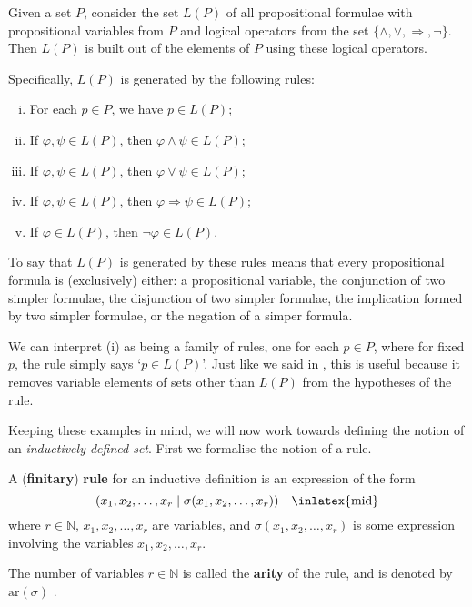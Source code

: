\begin{example}
\label{exPropositionalFormulaeAsInductivelyDefinedSetPreliminary}
Given a set $P$, consider the set $L(P)$ of all propositional formulae with propositional variables from $P$ and logical operators from the set $\{ {\wedge}, {\vee}, {\Rightarrow}, {\neg} \}$. Then $L(P)$ is built out of the elements of $P$ using these logical operators.

Specifically, $L(P)$ is generated by the following rules:
\begin{enumerate}[(i)]
\item For each $p \in P$, we have $p \in L(P)$;
\item If $\varphi, \psi \in L(P)$, then $\varphi \wedge \psi \in L(P)$;
\item If $\varphi, \psi \in L(P)$, then $\varphi \vee \psi \in L(P)$;
\item If $\varphi, \psi \in L(P)$, then $\varphi \Rightarrow \psi \in L(P)$;
\item If $\varphi \in L(P)$, then $\neg \varphi \in L(P)$.
\end{enumerate}

To say that $L(P)$ is generated by these rules means that every propositional formula is (exclusively) either: a propositional variable, the conjunction of two simpler formulae, the disjunction of two simpler formulae, the implication formed by two simpler formulae, or the negation of a simper formula.

We can interpret (i) as being a family of rules, one for each $p \in P$, where for fixed $p$, the rule simply says `$p \in L(P)$'. Just like we said in , this is useful because it removes variable elements of sets other than $L(P)$ from the hypotheses of the rule.
\end{example}

Keeping these examples in mind, we will now work towards defining the notion of an \textit{inductively defined set}. First we formalise the notion of a rule.

\begin{definition}
\label{defRuleForInductiveDefinition}
A (\textbf{finitary}) \textbf{rule} for an inductive definition is an expression of the form
\[ (x_1,x_2,\dots,x_r \mid \sigma(x_1,x_2,\dots,x_r)) \quad \text{\inlatex{mid}} \]
where $r \in \mathbb{N}$, $x_1,x_2,\dots,x_r$ are variables, and $\sigma(x_1,x_2,\dots,x_r)$ is some expression involving the variables $x_1,x_2,\dots,x_r$.

The number of variables $r \in \mathbb{N}$ is called the \textbf{arity} of the rule, and is denoted by $\mathrm{ar}(\sigma)$ .
\end{definition}

